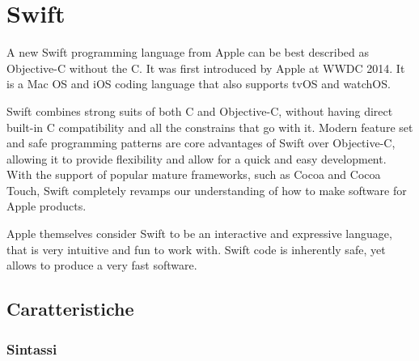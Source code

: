 \chapter{Swift}
A new Swift programming language from Apple can be best described as Objective-C without the C. It was first introduced by Apple at WWDC 2014. It is a Mac OS and iOS coding language that also supports tvOS and watchOS.

Swift combines strong suits of both C and Objective-C, without having direct built-in C compatibility and all the constrains that go with it. Modern feature set and safe programming patterns are core advantages of Swift over Objective-C, allowing it to provide flexibility and allow for a quick and easy development. With the support of popular mature frameworks, such as Cocoa and Cocoa Touch, Swift completely revamps our understanding of how to make software for Apple products.

Apple themselves consider Swift to be an interactive and expressive language, that is very intuitive and fun to work with. Swift code is inherently safe, yet allows to produce a very fast software.
\section{Caratteristiche}
\subsection{Sintassi}

